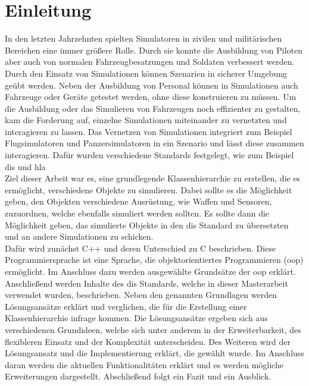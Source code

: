 \chapter{Einleitung}\label{Einleitung}
\onehalfspacing
In den letzten Jahrzehnten spielten Simulatoren in zivilen und militärischen Bereichen eine immer größere Rolle. Durch sie konnte die Ausbildung von Piloten aber auch von normalen Fahrzeugbesatzungen und Soldaten verbessert werden. Durch den Einsatz von Simulationen können Szenarien in sicherer Umgebung geübt werden. Neben der Ausbildung von Personal können in Simulationen auch Fahrzeuge oder Geräte getestet werden, ohne diese konstruieren zu müssen. 
Um die Ausbildung oder das Simulieren von Fahrzeugen noch effizienter zu gestalten, kam die Forderung auf, einzelne Simulationen miteinander zu vernetzten und interagieren zu lassen. Das Vernetzen von Simulationen integriert zum Beispiel Flugsimulatoren und Panzersimulatoren in ein Szenario und lässt diese zusammen interagieren. 
Dafür wurden verschiedene Standards festgelegt, wie zum Beispiel \ac{dis} und \ac{hla}\\ 
Ziel dieser Arbeit war es, eine grundlegende Klassenhierarchie zu erstellen, die es ermöglicht, verschiedene Objekte zu simulieren. Dabei sollte es die Möglichkeit geben, den Objekten verschiedene Ausrüstung, wie Waffen und Sensoren, zuzuordnen, welche ebenfalls simuliert werden sollten. Es sollte dann die Möglichkeit geben, das simulierte Objekte in den \ac{dis} Standard zu übersetzten und an andere Simulationen zu schicken.  \\
Dafür wird zunächst C++ und deren Unterschied zu C beschrieben. Diese Programmiersprache ist eine Sprache, die objektorientiertes Programmieren (\acs{oop}) ermöglicht. Im Anschluss dazu werden ausgewählte Grundsätze der \acs{oop} erklärt. Anschließend werden Inhalte des \ac{dis} Standards, welche in dieser Masterarbeit verwendet wurden, beschrieben. Neben den genannten Grundlagen werden Lösungsansätze erklärt und verglichen, die für die Erstellung einer Klassenhierarchie infrage kommen. Die Lösungsansätze ergeben sich aus verschiedenen Grundideen, welche sich unter anderem in der Erweiterbarkeit, des flexibleren Einsatz und der Komplexität unterscheiden.   Des Weiteren wird der Lösungsansatz und die Implementierung  erklärt, die gewählt wurde. Im Anschluss daran werden die aktuellen Funktionalitäten erklärt und es werden mögliche Erweiterungen dargestellt. Abschließend folgt ein Fazit und ein Ausblick.  
       